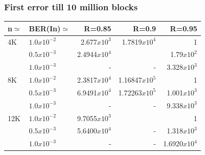 \documentclass[xcolor=dvipsname]
{beamer}
\begin{document}
\begin{frame}[t] 
\frametitle{First error till 10 million blocks}

\begin{table}[]
\centering
\begin{tabular}{|l|l|r|r|r|}
\hline
n$\simeq$   & BER(In)$\simeq$  & R=0.85  & R=0.9 & R=0.95 \\ \hline
4K  & $1.0x10^{-2}$    &2.677$x10^{3}$           &1.7819$x10^{4}$       &1       \\ 
    & $0.5x10^{-3}$    &2.4944$x10^{4}$          &					     &1.79$x10^{2}$   \\ 
    & $1.0x10^{-3}$    &-        				 &-                		&3.328$x10^{3}$ \\ \hline
8K  & $1.0x10^{-2}$    &2.3817$x10^{4}$          &1.16847$x10^{5}$        &1   \\ 
    & $0.5x10^{-3}$    &6.9491$x10^{4}$          &1.72263$x10^{5}$        &1.001$x10^{3}$  \\ 
    & $1.0x10^{-3}$    &-                		 &-                		&9.338$x10^{3}$           \\ \hline
12K & $1.0x10^{-2}$    &9.7055$x10^{3}$          &       		 		&1       \\
    & $0.5x10^{-3}$    &5.6400$x10^{4}$          &-     			 		&1.318$x10^{3}$             \\ 
    & $1.0x10^{-3}$    &- 			             &-    					 &1.6920$x10^{4}$   \\ \hline 
\end{tabular}
\end{table}

\end{frame}
\end{document}
